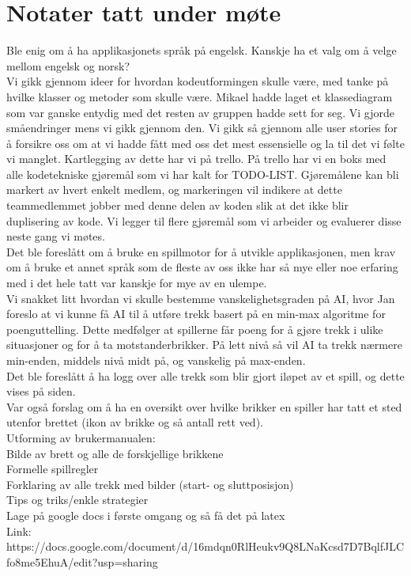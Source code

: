 \documentclass[letterpaper,11pt]{article}
\begin{document}
\section*{Notater tatt under møte}
Ble enig om å ha applikasjonets språk på engelsk. Kanskje ha et valg om å velge mellom engelsk og norsk?\\
Vi gikk gjennom ideer for hvordan kodeutformingen skulle være, med tanke på hvilke klasser og metoder som skulle være. Mikael hadde laget et klassediagram
som var ganske entydig med det resten av gruppen hadde sett for seg. Vi gjorde småendringer mens vi gikk gjennom den. Vi gikk så gjennom alle user stories for å forsikre  oss om at vi hadde fått med oss det mest essensielle og la til det vi følte vi manglet. Kartlegging av dette har vi på trello. På trello har vi en boks med alle kodetekniske gjøremål som vi har kalt for TODO-LIST. Gjøremålene kan bli markert av hvert enkelt medlem, og markeringen vil indikere at dette teammedlemmet jobber med denne delen av koden slik at det ikke blir duplisering av kode. Vi legger til flere gjøremål som vi arbeider og evaluerer disse neste gang vi møtes.\\
Det ble foreslått om å bruke en spillmotor for å utvikle applikasjonen, men krav om å bruke et annet språk som de fleste av oss ikke har så mye eller noe erfaring med i det hele tatt var kanskje for mye av en ulempe.\\

Vi snakket litt hvordan vi skulle bestemme vanskelighetsgraden på AI, hvor Jan foreslo at vi kunne få AI til å utføre trekk basert på en min-max algoritme for poenguttelling. Dette medfølger at spillerne får poeng for å gjøre trekk i ulike situasjoner og for å ta motstanderbrikker. På lett nivå så vil AI ta trekk nærmere min-enden, middels nivå midt på, og vanskelig på max-enden.\\

Det ble foreslått å ha logg over alle trekk som blir gjort iløpet av et spill, og dette vises på siden.\\
Var også forslag om å ha en oversikt over hvilke brikker en spiller har tatt et sted utenfor brettet (ikon av brikke og så antall rett ved).\\

Utforming av brukermanualen:\\
Bilde av brett og alle de forskjellige brikkene\\
Formelle spillregler\\
Forklaring av alle trekk med bilder (start- og sluttposisjon)\\
Tips og triks/enkle strategier\\
Lage på google docs i første omgang og så få det på latex\\
Link: https://docs.google.com/document/d/16mdqn0RlHeukv9Q8LNaKcsd7D7BqlfJLCfo8me5EhuA/edit?usp=sharing\\
\end{document}
